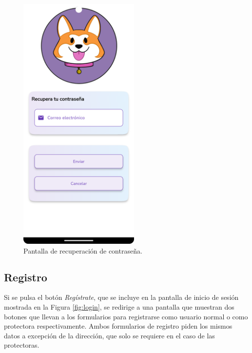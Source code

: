 \documentclass[a4paper, 12pt]{article}
\begin{document}
\begin{figure}[H]
	\begin{center}
		{\includegraphics[width=6cm]{app/RecoverPassword.png}\par}
		\caption{Pantalla de recuperación de contraseña.}
	\end{center}
\end{figure}

\newpage
\subsection*{Registro}

Si se pulsa el botón \textit{Regístrate}, que se incluye en la pantalla de inicio de sesión mostrada en la Figura \ref{fig:login}, se redirige a una pantalla que muestran dos botones que llevan a los formularios para registrarse como usuario normal o como protectora respectivamente. Ambos formularios de registro piden los mismos datos a excepción de la dirección, que solo se requiere en el caso de las protectoras.
\end{document}

